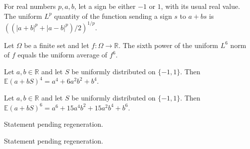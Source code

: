 \begin{theorem}
\label{FABL.uniformLpNorm_affineSign}
\leanok
{}
For real numbers $p,a,b$, let a sign be either $-1$ or $1$, with its usual real value.
The uniform $L^p$ quantity of the function sending a sign $s$ to $a+bs$ is
$\left((|a+b|^p+|a-b|^p)/2\right)^{1/p}$.
\end{theorem}

\begin{theorem}
\label{FABL.uniformLpNorm_six_pow_eq_expect_six}
\leanok
{}
Let $\Omega$ be a finite set and let $f\colon\Omega\to\mathbb R$. The sixth power of the
uniform $L^6$ norm of $f$ equals the uniform average of $f^6$.
\end{theorem}

\begin{theorem}
\label{FABL.expect_affineSign_fourth}
\leanok
{}
Let $a,b\in\mathbb{R}$ and let $S$ be uniformly distributed on $\{-1,1\}$. Then
$\mathbb{E}(a+bS)^4=a^4+6a^2b^2+b^4$.
\end{theorem}

\begin{theorem}
\label{FABL.expect_affineSign_sixth}
\leanok
{}
Let $a,b\in\mathbb{R}$ and let $S$ be uniformly distributed on $\{-1,1\}$. Then
$\mathbb{E}(a+bS)^6=a^6+15a^4b^2+15a^2b^4+b^6$.
\end{theorem}

\begin{theorem}
\label{FABL.average_rpow_lower_quadratic}
\leanok
{}
Statement pending regeneration.
\end{theorem}

\begin{theorem}
\label{FABL.normalized_pTwo_affine}
\leanok
{}
Statement pending regeneration.
\end{theorem}

